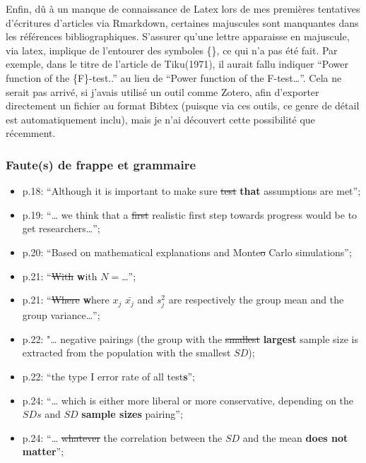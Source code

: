 \documentclass[
  12pt,
  french,
]{article}
\providecommand{\tightlist}{%
  \setlength{\itemsep}{0pt}\setlength{\parskip}{0pt}}
\begin{document}
Enfin, dû à un manque de connaissance de Latex lors de mes premières
tentatives d'écritures d'articles via Rmarkdown, certaines majuscules
sont manquantes dans les références bibliographiques. S'assurer qu'une
lettre apparaisse en majuscule, via latex, implique de l'entourer des
symboles \{\}, ce qui n'a pas été fait. Par exemple, dans le titre de
l'article de Tiku(1971), il aurait fallu indiquer ``Power function of
the \{F\}-test..'' au lieu de ``Power function of the F-test\ldots{}''.
Cela ne serait pas arrivé, si j'avais utilisé un outil comme Zotero,
afin d'exporter directement un fichier au format Bibtex (puisque via ces
outils, ce genre de détail est automatiquement inclu), mais je n'ai
découvert cette possibilité que récemment.

\hypertarget{fautes-de-frappe-et-grammaire}{%
\subsubsection{Faute(s) de frappe et
grammaire}\label{fautes-de-frappe-et-grammaire}}

\begin{itemize}
\tightlist
\item
  p.18: ``Although it is important to make sure \sout{test}
  \textbf{that} assumptions are met'';\\
\item
  p.19: ``\ldots{} we think that a \sout{first} realistic first step
  towards progress would be to get researchers\ldots{}'';\\
\item
  p.20: ``Based on mathematical explanations and Monte\sout{o} Carlo
  simulations'';\\
\item
  p.21: ``\sout{With} \textbf{w}ith \(N=\)\ldots{}'';\\
\item
  p.21: ``\sout{Where} \textbf{w}here \sout{\(x_j\)} \(\bar{x_j}\) and
  \(s^2_j\) are respectively the group mean and the group
  variance\ldots{}'';\\
\item
  p.22: "\ldots{} negative pairings (the group with the \sout{smallest}
  \textbf{largest} sample size is extracted from the population with the
  smallest \(SD\));\\
\item
  p.22: ``the type I error rate of all test\textbf{s}'';\\
\item
  p.24: ``\ldots{} which is either more liberal or more conservative,
  depending on the \(SDs\) and \sout{\(SD\)} \textbf{sample sizes}
  pairing'';\\
\item
  p.24: ``\ldots{} \sout{whatever} the correlation between the \(SD\)
  and the mean \textbf{does not matter}'';
\end{itemize}
\end{document}
